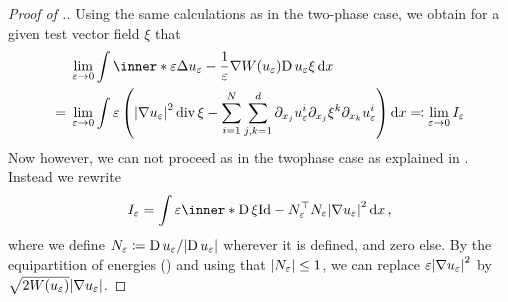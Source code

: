 \begin{proof}[Proof of .]
	Using the same calculations as in the two-phase case, we obtain for a given 
	test vector field $ \xi $ that
	\begin{align*}
		& \lim_{ \varepsilon \to 0 }
		\int
		\inner*{
			\varepsilon \Delta u_{ \varepsilon }
			-
			\frac{ 1 }{ \varepsilon } \nabla W ( u_{ \varepsilon } )
		}
		{
			\diff u_{ \varepsilon } \xi
		}
		\dd{ x }
		\\
		={} &
		\lim_{ \varepsilon \to 0 }
		\int
		\varepsilon
		\left(
		\abs{ \nabla u_{ \varepsilon } }^{ 2 }
		\divg \xi 
		-
		\sum_{ i = 1 }^{ N }
		\sum_{ j, k = 1 }^{ d }
		\partial_{ x_{ j } } u_{ \varepsilon }^{ i }
		\partial_{ x_{ j } } \xi^{ k }
		\partial_{ x_{ k } } u_{ \varepsilon }^{ i }
		\right)
		\dd{ x } 
		\eqqcolon 
		\lim_{ \varepsilon \to 0 } I_{ \varepsilon }
	\end{align*}
	Now however, we can not proceed as in the twophase case as explained in 
	. 
	Instead we rewrite
	\begin{equation}
		\label{key_equality_for_ptw_estimate}
		I_{ \varepsilon }
		=
		\int
		\varepsilon
		\inner*{
			\diff \xi 
		}
		{
			\mathrm{Id} - N_{ \varepsilon }^{ \top } N_{ \varepsilon }
		}
		\abs{ \nabla u_{ \varepsilon } }^{ 2 }
		\dd{ x },
	\end{equation}
	where we define $ N_{ \varepsilon } \coloneqq \operatorname{D} u_{ \varepsilon } / 
	\abs{ \operatorname{D} u_{ \varepsilon } } $ wherever it is defined, and zero else. 
	By the equipartition of energies 
	() and using that 
	$ \abs{N_{ \varepsilon } } \leq 1 $, we can replace $ \varepsilon \abs{ 
	\nabla u_{ 
	\varepsilon } }^{ 2 } $ by $ \sqrt{ 2 W ( u_{ \varepsilon } ) } \abs{ 
	\nabla u_{ \varepsilon  } } $. 
	

\end{proof}
